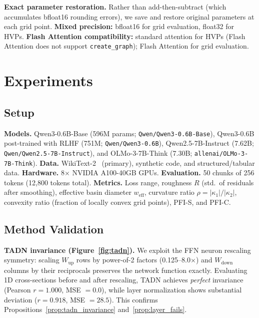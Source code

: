 \documentclass{article}
\begin{document}
\textbf{Exact parameter restoration.} Rather than add-then-subtract (which accumulates bfloat16 rounding errors), we save and restore original parameters at each grid point. \textbf{Mixed precision:} bfloat16 for grid evaluation, float32 for HVPs. \textbf{Flash Attention compatibility:} standard attention for HVPs (Flash Attention does not support \texttt{create\_graph}); Flash Attention for grid evaluation.

\section{Experiments}
\label{sec:experiments}

\subsection{Setup}
\label{sec:setup}

\textbf{Models.} Qwen3-0.6B-Base (596M params; \texttt{Qwen/Qwen3-0.6B-Base}), Qwen3-0.6B post-trained with RLHF (751M; \texttt{Qwen/Qwen3-0.6B}), Qwen2.5-7B-Instruct (7.62B; \texttt{Qwen/Qwen2.5-7B-Instruct}), and OLMo-3-7B-Think (7.30B; \texttt{allenai/OLMo-3-7B-Think}). \textbf{Data.} WikiText-2~\citep{merity2017pointer} (primary), synthetic code, and structured/tabular data. \textbf{Hardware.} 8$\times$ NVIDIA A100-40GB GPUs. \textbf{Evaluation.} 50 chunks of 256 tokens (12,800 tokens total). \textbf{Metrics.} Loss range, roughness $R$ (std.\ of residuals after smoothing), effective basin diameter $w_{\text{eff}}$, curvature ratio $\rho = |\kappa_1|/|\kappa_2|$, convexity ratio (fraction of locally convex grid points), PFI-S, and PFI-C.

\subsection{Method Validation}
\label{sec:validation}

\textbf{TADN invariance (Figure~\ref{fig:tadn}).} We exploit the FFN neuron rescaling symmetry: scaling $W_{\text{up}}$ rows by power-of-2 factors (0.125--8.0$\times$) and $W_{\text{down}}$ columns by their reciprocals preserves the network function exactly. Evaluating 1D cross-sections before and after rescaling, TADN achieves \emph{perfect} invariance (Pearson $r = 1.000$, MSE $= 0.0$), while layer normalization shows substantial deviation ($r = 0.918$, MSE $= 28.5$). This confirms Propositions~\ref{prop:tadn_invariance} and~\ref{prop:layer_fails}.
\end{document}
